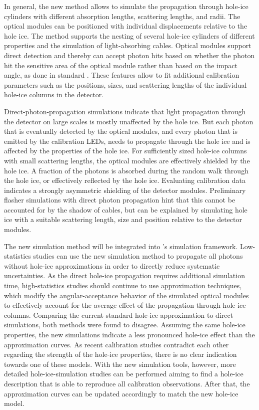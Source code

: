 In general, the new method allows to simulate the propagation through hole-ice cylinders with different absorption lengths, scattering lengths, and radii.
The optical modules can be positioned with individual displacements relative to the hole ice.
The method supports the nesting of several hole-ice cylinders of different properties and the simulation of light-absorbing cables.
Optical modules support direct detection and thereby can accept photon hits based on whether the photon hit the sensitive area of the optical module rather than based on the impact angle, as done in standard \clsim.
These features allow to fit additional calibration parameters such as the positions, sizes, and scattering lengths of the individual hole-ice columns in the \icecube detector.

Direct-photon-propagation simulations indicate that light propagation through the \icecube detector on large scales is mostly unaffected by the hole ice. But each photon that is eventually detected by the optical modules, and every photon that is emitted by the calibration LEDs, needs to propagate through the hole ice and is affected by the properties of the hole ice.
For sufficiently sized hole-ice columns with small scattering lengths, the optical modules are effectively shielded by the hole ice. A fraction of the photons is absorbed during the random walk through the hole ice, or effectively reflected by the hole ice.
Evaluating calibration data indicates a strongly asymmetric shielding of the detector modules. Preliminary flasher simulations with direct photon propagation hint that this cannot be accounted for by the shadow of cables, but can be explained by simulating hole ice with a suitable scattering length, size and position relative to the detector modules.

The new simulation method will be integrated into \icecube's simulation framework.
Low-statistics studies can use the new simulation method to propagate all photons without hole-ice approximations in order to directly reduce systematic uncertainties.
As the direct hole-ice propagation requires additional simulation time, high-statistics studies should continue to use approximation techniques, which modify the angular-acceptance behavior of the simulated optical modules to effectively account for the average effect of the propagation through hole-ice columns.
Comparing the current standard hole-ice approximation to direct simulations, both methods were found to disagree.
Assuming the same hole-ice properties, the new simulations indicate a less pronounced hole-ice effect than the approximation curves.
As recent calibration studies contradict each other regarding the strength of the hole-ice properties, there is no clear indication towards one of these models.
With the new simulation tools, however, more detailed hole-ice-simulation studies can be performed aiming to find a hole-ice description that is able to reproduce all calibration observations.
After that, the approximation curves can be updated accordingly to match the new hole-ice model.

